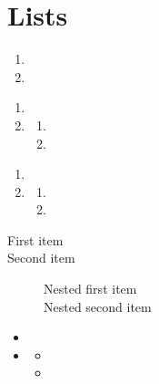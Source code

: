 \documentclass[solutionsatend]{ouunit}
\newenvironment{highlight}[1][]{\begin{style2box}[#1]}{\end{style2box}}
\begin{document}
\section{Lists}
\lipsum[133]
\begin{enumerate}
\item
\lipsum[133]
\item
\lipsum[133]
\end{enumerate}
\lipsum[133]
\begin{enumerate}
\item
\lipsum[133]
\item
\lipsum[133]
\begin{enumerate}
\item
\lipsum[133]
\item
\lipsum[133]
\end{enumerate}
\end{enumerate}
\begin{highlight}
\lipsum[133]
\begin{enumerate}
\item
\lipsum[133]
\item
\lipsum[133]
\begin{enumerate}
\item
\lipsum[133]
\item
\lipsum[133]
\end{enumerate}
\end{enumerate}
\end{highlight}
\lipsum[133]
\begin{description}
\item[First item]
\lipsum[133]
\item[Second item]
\lipsum[133]
\begin{description}
\item[Nested first item]
\lipsum[133]
\item[Nested second item]
\lipsum[133]
\end{description}
\end{description}
\lipsum[133]
\begin{itemize}
\item
\lipsum[133]
\item
\lipsum[133]
\begin{itemize}
\item
\lipsum[133]
\item
\lipsum[133]
\end{itemize}
\end{itemize}
\lipsum[133]
\end{document}

